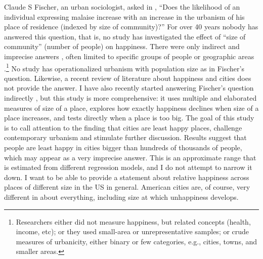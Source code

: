\documentclass[12pt, letterpaper]{article}
\begin{document}
\begin{spacing}{1.9}
Claude S Fischer, an urban sociologist, asked in  \citeyear{fischer73}, ``Does the likelihood
of an individual  expressing malaise increase with an  increase in
the urbanism of his place of residence (indexed by size of
community)?'' For over 40 years nobody has answered this
question, that is, no study has investigated the effect of ``size of
  community'' (number of people) on happiness. There were only indirect and
  imprecise  answers \citep{fischer73,fischer82,veenhoven94}, often 
  limited to specific groups of people or
  geographic areas \citep{amato92,adams92,adams00s,balducci09, evans09, lu15}.\footnote{Researchers either did not measure happiness, but related concepts (health, income, etc);  or they used small-area or unrepresentative  samples; or crude measures of
    urbanicity, either binary or few categories, e.g., cities, towns, and smaller areas.}  No study has operationalized urbanism with
  population size as in Fischer's question. 
Likewise, a recent review of literature about 
  happiness and cities \citep{ballas13} does not provide the answer.
I have also recently started answering Fischer's question indirectly  \citep{aok11a}, but this study is more comprehensive:  
 it uses multiple and elaborated measures of size of a place, explores how
 exactly happiness declines when size of a place increases, and tests directly
 when a place is too big.  
The goal of this study is to call attention to the finding that cities are
least happy places, challenge contemporary urbanism and stimulate
further discussion. Results suggest that people are least happy in cities bigger
than hundreds of thousands of people, which  may appear as a very
imprecise answer. This is an approximate range that is estimated from different
regression models, and I do not attempt to narrow it down. I want to be able to
provide a statement about relative happiness across places of different size in
the US in general. American cities are, of course, very different in about everything,
including size at which unhappiness develops. %



\end{spacing}
\end{document}
